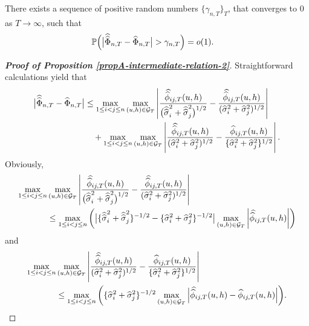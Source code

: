\documentclass[a4paper,12pt]{article}
\newcommand{\doublehat}[1]{\skew{5.5}\widehat{\widehat{#1}}}
\newcommand{\doublehattwo}[1]{\widehat{\widehat{#1}}}
\begin{document}
\begin{propA}\label{propA-intermediate-relation-2}
There exists a sequence of positive random numbers $\{\gamma_{n, T}\}_T$, that converges to $0$ as $T\to \infty$, such that
\begin{align}\label{eq-intermediate-relation-2}
\pr \Big(\big|\doublehattwo{\Phi}_{n,T} &- \widehat{\Phi}_{n,T}\big| > \gamma_{n, T} \Big) = o(1).
\end{align}
\end{propA}
\begin{proof}[\textnormal{\textbf{Proof of Proposition \ref{propA-intermediate-relation-2}}}] 

Straightforward calculations yield that
\begin{align*}
\begin{split}
\big| \doublehattwo{\Phi}_{n, T} - \widehat{\Phi}_{n, T} \big| &\le \max_{1 \le i < j \le n} \max_{(u,h) \in \mathcal{G}_T} \left|\frac{\doublehat{\phi}_{ij,T}(u,h)}{\big(\doublehattwo{\sigma}_i^2 + \doublehattwo{\sigma}_j^2\big)^{1/2}} - \frac{\doublehat{\phi}_{ij,T}(u,h)}{(\widehat{\sigma}_i^2 + \widehat{\sigma}_j^2)^{1/2}}\right| \\
&\quad+\max_{1 \le i < j \le n} \max_{(u,h) \in \mathcal{G}_T} \left|\frac{\doublehat{\phi}_{ij,T}(u,h)}{(\widehat{\sigma}_i^2 + \widehat{\sigma}_j^2)^{1/2}} - \frac{\widehat{\phi}_{ij,T}(u,h)} {\{ \widehat{\sigma}_i^2 + \widehat{\sigma}_j^2 \}^{1/2}} \right|.
\end{split}
\end{align*}
Obviously,
\begin{align*}
\max_{1 \le i < j \le n} &\max_{(u,h) \in \mathcal{G}_T} \left|\frac{\doublehat{\phi}_{ij,T}(u,h)}{\big(\doublehattwo{\sigma}_i^2 + \doublehattwo{\sigma}_j^2\big)^{1/2}} - \frac{\doublehat{\phi}_{ij,T}(u,h)}{(\widehat{\sigma}_i^2 + \widehat{\sigma}_j^2)^{1/2}}\right|  \\
&\le\max_{1 \le i < j \le n} \left( \big|\{\doublehattwo{\sigma}_i^2 + \doublehattwo{\sigma}_j^2 \}^{-1/2} - \{\widehat{\sigma}_i^2 + \widehat{\sigma}_j^2 \}^{-1/2}\big| \max_{(u,h) \in \mathcal{G}_T} \left|\doublehat{\phi}_{ij,T}(u,h)\right|\right)
\end{align*}
and 
\begin{align*}
\max_{1 \le i < j \le n} &\max_{(u,h) \in \mathcal{G}_T} \left|\frac{\doublehat{\phi}_{ij,T}(u,h)}{(\widehat{\sigma}_i^2 + \widehat{\sigma}_j^2)^{1/2}} - \frac{\widehat{\phi}_{ij,T}(u,h)} {\{ \widehat{\sigma}_i^2 + \widehat{\sigma}_j^2 \}^{1/2}} \right| \\
&\le \max_{1\le i < j \le n} \bigg( \{\widehat{\sigma}_i^2 + \widehat{\sigma}_j^2 \}^{-1/2}\max_{(u,h) \in \mathcal{G}_T} \Big| \doublehat{\phi}_{ij, T}(u,h) - \widehat{\phi}_{ij, T}(u,h) \Big|\bigg).
\end{align*}



\end{proof}
\end{document}
